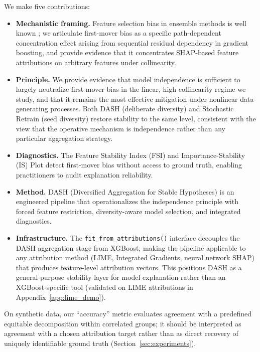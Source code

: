 \documentclass[11pt]{article}
\newcommand{\dash}{\textsc{DASH}}
\begin{document}
We make five contributions:
\begin{itemize}
  \item \textbf{Mechanistic framing.} Feature selection bias in ensemble methods
    is well known \citep{strobl2007bias, hooker2019please}; we articulate
    first-mover bias as a specific path-dependent concentration effect
    arising from sequential residual dependency in gradient
    boosting, and provide evidence that it concentrates SHAP-based feature
    attributions on arbitrary features under collinearity.
  \item \textbf{Principle.} We provide evidence that model independence is
    sufficient to largely neutralize first-mover bias in the linear,
    high-collinearity regime we study, and that it remains the most
    effective mitigation under nonlinear data-generating processes.  Both \dash{} (deliberate diversity) and
    Stochastic Retrain (seed diversity) restore stability to the same
    level, consistent with the view that the operative mechanism is independence
    rather than any particular aggregation strategy.
  \item \textbf{Diagnostics.} The Feature Stability Index (FSI) and
    Importance-Stability (IS) Plot detect first-mover bias without
    access to ground truth, enabling practitioners to audit explanation
    reliability.
  \item \textbf{Method.} \dash{} (Diversified Aggregation for Stable Hypotheses) is
    an engineered pipeline that operationalizes the independence principle
    with forced feature restriction, diversity-aware model selection,
    and integrated diagnostics.
  \item \textbf{Infrastructure.} The \texttt{fit\_from\_attributions()}
    interface decouples the DASH aggregation stage from XGBoost, making
    the pipeline applicable to any attribution method (LIME, Integrated
    Gradients, neural network SHAP) that produces feature-level
    attribution vectors.  This positions \dash{} as a general-purpose
    stability layer for model explanation rather than an XGBoost-specific tool
    (validated on LIME attributions in Appendix~\ref{app:lime_demo}).
\end{itemize}

\noindent On synthetic data, our ``accuracy'' metric evaluates agreement with a
predefined equitable decomposition within correlated groups; it should be
interpreted as agreement with a chosen attribution target rather than as
direct recovery of uniquely identifiable ground truth
(Section~\ref{sec:experiments}).
\end{document}
